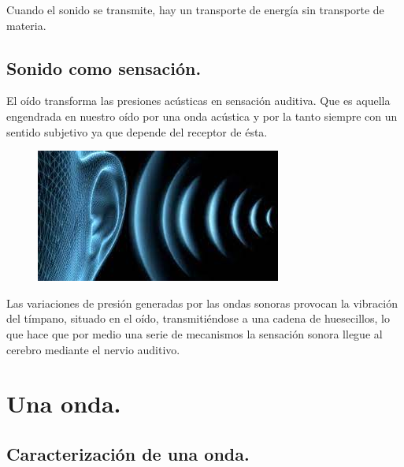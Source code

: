 \documentclass[12pt, letter]{article}
\begin{document}
Cuando el sonido se transmite, hay un transporte de energía sin transporte de materia.

\subsection{Sonido como sensación.}

El oído transforma las presiones acústicas en sensación auditiva. Que es aquella engendrada en nuestro oído por una onda acústica y por la tanto siempre con un sentido subjetivo ya que depende del receptor de ésta.

\begin{figure}[H]
\centering
\includegraphics[scale=0.7]{Imagenes/Ondas_05.jpg}
\end{figure}

Las variaciones de presión generadas por las ondas sonoras provocan la vibración del tímpano, situado en el oído, transmitiéndose a una cadena de huesecillos, lo que hace que por medio una serie de mecanismos la sensación sonora llegue al cerebro mediante el nervio auditivo.

% 
\section{Una onda.}

\subsection{Caracterización de una onda.}
\end{document}
